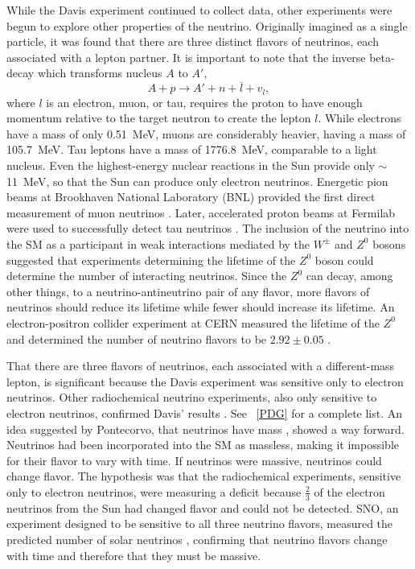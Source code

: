 While the Davis experiment continued to collect data, other experiments were begun to explore other properties of the neutrino.  Originally imagined as a single particle, it was found that there are three distinct flavors of neutrinos, each associated with a lepton partner.  It is important to note that the inverse beta-decay which transforms nucleus $A$ to $A'$,
\begin{equation}
A + p \rightarrow A' + n + \overline{l} + v_l,
\end{equation}
where $l$ is an electron, muon, or tau, requires the proton to have enough momentum relative to the target neutron to create the lepton $l$.  While electrons have a mass of only 0.51~MeV, muons are considerably heavier, having a mass of 105.7~MeV.  Tau leptons have a mass of 1776.8~MeV, comparable to a light nucleus. Even the highest-energy nuclear reactions in the Sun provide only $\sim$11~MeV, so that the Sun can produce only electron neutrinos.  Energetic pion beams at Brookhaven National Laboratory (BNL) provided the first direct measurement of muon neutrinos \cite{muonNeutrino}.  Later, accelerated proton beams at Fermilab were used to successfully detect tau neutrinos \cite{tauNeutrino}.  The inclusion of the neutrino into the SM as a participant in weak interactions mediated by the $W^{\pm}$ and $Z^0$ bosons suggested that experiments determining the lifetime of the $Z^0$ boson could determine the number of interacting neutrinos.  Since the $Z^0$ can decay, among other things, to a neutrino-antineutrino pair of any flavor, more flavors of neutrinos should reduce its lifetime while fewer should increase its lifetime.   An electron-positron collider experiment at CERN measured the lifetime of the $Z^0$ and determined the number of neutrino flavors to be $2.92\pm0.05$ \cite{PDG}.

That there are three flavors of neutrinos, each associated with a different-mass lepton, is significant because the Davis experiment was sensitive only to electron neutrinos.  Other radiochemical neutrino experiments, also only sensitive to electron neutrinos, confirmed Davis' results \cite{SNO_Sun,SuperK_Sun}.  See {}~\ref{PDG} for a complete list.  An idea suggested by Pontecorvo, that neutrinos have mass \cite{Pontecorvo}, showed a way forward.  Neutrinos had been incorporated into the SM as massless, making it impossible for their flavor to vary with time.  If neutrinos were massive, neutrinos could change flavor.  The hypothesis was that the radiochemical experiments, sensitive only to electron neutrinos, were measuring a deficit because $\frac{2}{3}$ of the electron neutrinos from the Sun had changed flavor and could not be detected.  SNO, an experiment designed to be sensitive to all three neutrino flavors, measured the predicted number of solar neutrinos \cite{SNO_Sun}, confirming that neutrino flavors change with time and therefore that they must be massive.

